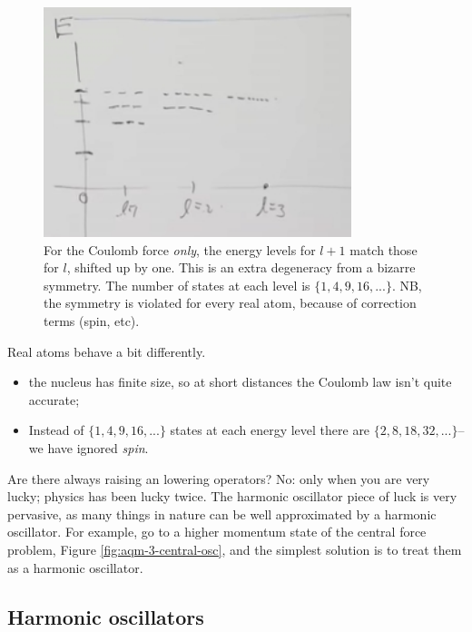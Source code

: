 \documentclass[]{article}
\begin{document}
\begin{figure}[H]
	\begin{center}
		\caption[Energy Levels for the Coulomb Force]{For the Coulomb force \emph{only}, the energy levels for $l+1$ match those for $l$, shifted up by one. This is an extra degeneracy from a bizarre symmetry. The number of states at each level is  $\{1,4,9,16,...\}$. NB, the symmetry is violated for every real atom, because of correction terms (spin, etc).}\label{fig:aqm-3-central-coulomb}
		\includegraphics[width=0.8\textwidth]{aqm-3-central-coulomb}
	\end{center}
\end{figure}

Real atoms behave a bit differently.
\begin{itemize}
	\item the nucleus has finite size, so at short distances the Coulomb law isn't quite accurate;
	\item Instead of  $\{1,4,9,16,...\}$ states at each energy level there are  $\{2,8,18,32,...\}$--we have ignored \emph{spin}.
\end{itemize}

Are there always raising an lowering operators? No: only when you are very lucky; physics has been lucky twice. The harmonic oscillator piece of luck is very pervasive, as many things in nature can be well approximated by a harmonic oscillator. For example, go to a higher momentum state of the central force problem, Figure \ref{fig:aqm-3-central-osc}, and the simplest solution is to treat them as a harmonic oscillator.

\subsection{Harmonic oscillators}\label{sect:harmonic:oscillators}
\end{document}
